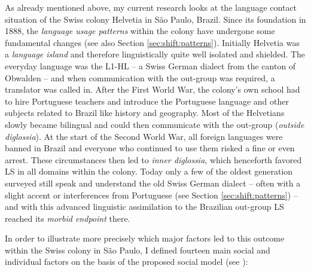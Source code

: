 \documentclass[output=paper]{langscibook}
\begin{document}
\hspace*{-2.2pt}As already mentioned above, my current research \parencite{Karnopp} looks at the language contact situation of the Swiss colony Helvetia in São Paulo, Brazil. Since its foundation in 1888, the \emph{language usage patterns} within the colony have undergone some fundamental changes (see also Section \ref{sec:shift:patterns}). Initially Helvetia was a \emph{language island} and therefore linguistically quite well isolated and shielded. The everyday language was the L1-HL -- a Swiss German dialect from the canton of Obwalden -- and when communication with the out-group was required, a translator was called in. After the First World War, the colony's own school had to hire Portuguese teachers and introduce the Portuguese language and other subjects related to Brazil like history and geography. Most of the Helvetians slowly became bilingual and could then communicate with the out-group (\emph{outside diglossia}). At the start of the Second World War, all foreign languages were banned in Brazil and everyone who continued to use them risked a fine or even arrest. These circumstances then led to \emph{inner diglossia}, which henceforth favored LS in all domains within the colony. Today only a few of the oldest generation surveyed still speak and understand the old Swiss German dialect -- often with a slight accent or interferences from Portuguese (see Section \ref{sec:shift:patterns}) -- and with this advanced linguistic assimilation to the Brazilian out-group LS reached its \emph{morbid endpoint} there.

In order to illustrate more precisely which major factors led to this outcome within the Swiss colony in São Paulo, I defined fourteen main social and individual factors on the basis of the proposed social model (see ):
\end{document}
